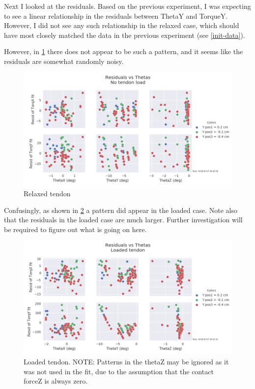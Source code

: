 \documentclass[preprint,12pt,3p]{elsarticle}
\begin{document}
Next I looked at the residuals. Based on the previous experiment, I was expecting to see a linear
relationship in the residuals between ThetaY and TorqueY. However, I did not see any such
relationship in the relaxed case, which should have most closely matched the data in the previous
experiment (see \cref{init-data}).


However, in \cref{fig:nopattern} there does not appear to be such a pattern, and it seems like the
residuals are somewhat randomly noisy.

\begin{figure}[tb!]
\centering
\includegraphics[width=.9\textwidth]{images/stiff/GOODResid_vs_Theta.png}
\caption{Relaxed tendon}
\label{fig:nopattern}
\end{figure}

Confusingly, as shown in \cref{fig:yespattern} a pattern did appear in the loaded case. Note also that the residuals in the loaded case
are much larger. Further investigation will be required to figure out what is going on here.

\begin{figure}[tb!]
\centering
\includegraphics[width=.8\textwidth]{images/stiff/GOODResid_vs_Theta_loaded.png}
\caption{Loaded tendon. NOTE: Patterns in the thetaZ may be ignored as it was not used in the fit,
    due to the assumption that the contact forceZ is always zero.  }
\label{fig:yespattern}
\end{figure}
\end{document}
